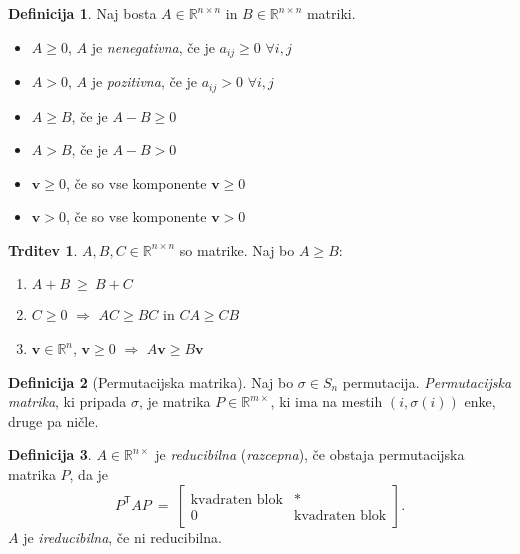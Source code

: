 \documentclass[11pt]{article}
\newcommand{\R}{\mathbb{R}}
\newcommand{\vv}{\mathbf{v}}
\newcommand{\0}{\mathbf{0}}
\newcommand{\T}{\mathsf{T}}
\theoremstyle{definition}
\newtheorem{definicija}{Definicija}[section]
\theoremstyle{definition}
\newtheorem{trditev}{Trditev}[section]
\theoremstyle{definition}
\theoremstyle{definition}
\begin{document}
\begin{definicija}

Naj bosta $A \in \R^{n \times n}$ in $B \in \R^{n \times n}$ matriki.
\begin{itemize}

\item $A \geq 0$, $A$ je \textit{nenegativna}, če je $a_{ij} \geq 0$ $\forall i,j$

\item $A > 0$, $A$ je \textit{pozitivna}, če je $a_{ij} > 0$ $\forall i,j$

\item $A \geq B$, če je $A-B \geq 0$

\item $A > B$, če je $A-B>0$

\item $\vv \geq 0$, če so vse komponente $\vv \geq 0$

\item $\vv > 0$, če so vse komponente $\vv > 0$
	
\end{itemize}

\end{definicija}
\vspace{0.5cm}

\begin{trditev}

$A,B,C \in \R^{n \times n}$ so matrike. Naj bo $A \geq B$:
\begin{enumerate}
\item $A+B ~\geq~ B+C$
\item $C \geq 0$ $\Longrightarrow$ $AC \geq BC$ in $CA \geq CB$
\item $\vv \in \R^n$, $\vv \geq 0$ $\Longrightarrow$ $A\vv \geq B\vv$
\end{enumerate}

\end{trditev}
\vspace{0.5cm}

\begin{definicija}[Permutacijska matrika]

Naj bo $\sigma \in S_n$ permutacija. \textit{Permutacijska matrika}, ki pripada $\sigma$, je matrika $P \in \R^{m \times}$, ki ima na mestih $(i, \sigma(i))$ enke, druge pa ničle.

\end{definicija}
\vspace{0.5cm}

\begin{definicija}

$A \in \R^{n \times}$ je \textit{reducibilna} (\textit{razcepna}), če obstaja permutacijska matrika $P$, da je
$$P^\T AP ~=~ \begin{bmatrix}
\text{kvadraten blok} & * \\
0 & \text{kvadraten blok}
\end{bmatrix}.$$
$A$ je \textit{ireducibilna}, če ni reducibilna.

\end{definicija}
\vspace{0.5cm}
\end{document}

